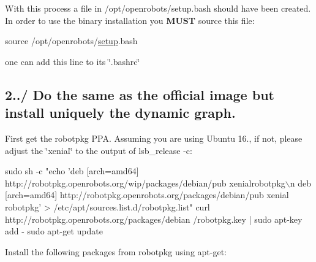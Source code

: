 With this process a file in /opt/openrobots/setup.bash should have been created. In order to use the binary installation you {\bfseries M\+U\+ST} source this file\+: 
\begin{DoxyCode}
source /opt/openrobots/\hyperlink{namespacesetup}{setup}.bash
\end{DoxyCode}
 one can add this line to its \char`\"{}.\+bashrc\char`\"{}\hypertarget{subpage_installation_install_subsec_binary}{}\subsection{2../ Do the same as the official image but install uniquely the dynamic graph.}\label{subpage_installation_install_subsec_binary}
First get the robotpkg P\+PA. Assuming you are using Ubuntu 16., if not, please adjust the \char`\"{}xenial\char`\"{} to the output of {\ttfamily lsb\+\_\+release -\/c}\+: 
\begin{DoxyCode}
sudo sh -c \textcolor{stringliteral}{"echo 'deb [arch=amd64] http://robotpkg.openrobots.org/wip/packages/debian/pub xenialrobotpkg\(\backslash\)n
      deb [arch=amd64] http://robotpkg.openrobots.org/packages/debian/pub xenial robotpkg' >
       /etc/apt/sources.list.d/robotpkg.list"}
curl http:\textcolor{comment}{//robotpkg.openrobots.org/packages/debian}
/robotpkg.key | sudo apt-key add -
sudo apt-\textcolor{keyword}{get} update
\end{DoxyCode}


Install the following packages from robotpkg using apt-\/get\+:


